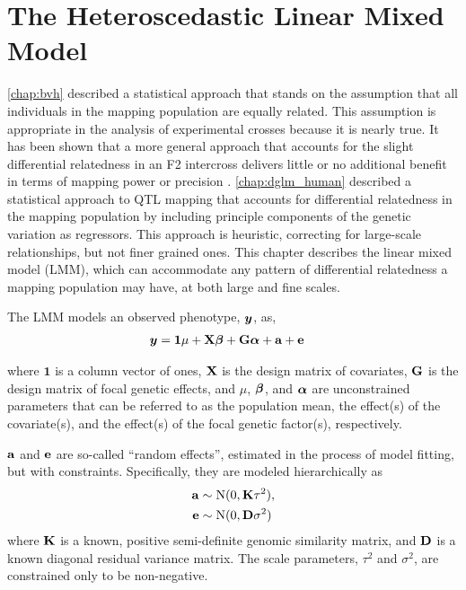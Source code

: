 \chapter{The Heteroscedastic Linear Mixed Model}
\label{chap:het_LMM}

\cref{chap:bvh} described a statistical approach that stands on the assumption that all individuals in the mapping population are equally related.
This assumption is appropriate in the analysis of experimental crosses because it is nearly true.
It has been shown that a more general approach that accounts for the slight differential relatedness in an F2 intercross delivers little or no additional benefit in terms of mapping power or precision \citep{Parker2014b}.
\cref{chap:dglm_human} described a statistical approach to QTL mapping that accounts for differential relatedness in the mapping population by including principle components of the genetic variation as regressors.
This approach is heuristic, correcting for large-scale relationships, but not finer grained ones.
This chapter describes the linear mixed model (LMM), which can accommodate any pattern of differential relatedness a mapping population may have, at both large and fine scales.

The LMM models an observed phenotype, $\bm{y}$, as,
\begin{align}
	\bm{y}	&= \mathbf{1}\mu + \mathbf{X}\boldsymbol{\beta} + \mathbf{G}\boldsymbol{\alpha} + \mathbf{a} + \mathbf{e}  \label{eq:lmm}
\end{align}

where $\mathbf{1}$ is a column vector of ones, $\mathbf{X}$ is the design matrix of covariates, $\mathbf{G}$ is the design matrix of focal genetic effects, and $\mu$, $\boldsymbol{\beta}$, and $\boldsymbol{\alpha}$ are unconstrained parameters that can be referred to as the population mean, the effect(s) of the covariate(s), and the effect(s) of the focal genetic factor(s), respectively.

$\mathbf{a}$ and $\mathbf{e}$ are so-called ``random effects'', estimated in the process of model fitting, but with constraints.
Specifically, they are modeled hierarchically as
\begin{align}
    \mathbf{a} &\sim \mathrm{N}(0, \mathbf{K} \tau^2) ,   \label{eq:a}\\
    \mathbf{e} &\sim \mathrm{N}(0, \mathbf{D} \sigma^2)   \label{eq:e}
\end{align}
where $\mathbf{K}$ is a known, positive semi-definite genomic similarity matrix, and $\mathbf{D}$ is a known diagonal residual variance matrix.
The scale parameters, $\tau^2$ and $\sigma^2$, are constrained only to be non-negative.

